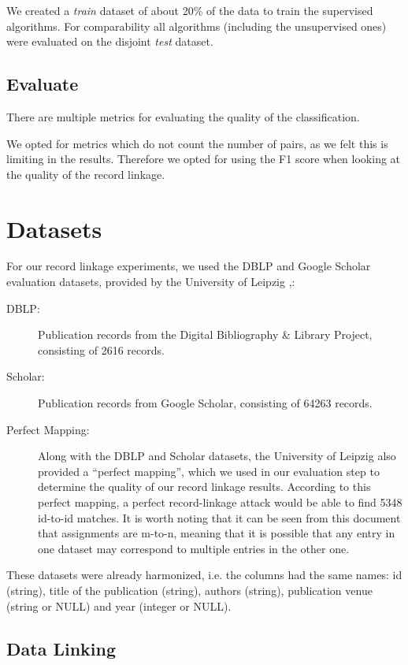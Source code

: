 \documentclass[sigconf,nonacm]{acmart}
\begin{document}
We created a \emph{train} dataset of about 20\% of the data to train
the supervised algorithms.
For comparability all algorithms (including the unsupervised ones)
were evaluated on the disjoint \emph{test} dataset.

\subsection{Evaluate}

There are multiple metrics for evaluating the quality of the classification.

We opted for metrics which do not count the number of pairs, as we felt
this is limiting in the results.
Therefore we opted for using the F1 score when looking at the quality
of the record linkage.

\section{Datasets}

For our record linkage experiments, we used the DBLP and Google Scholar evaluation datasets, provided by the University of Leipzig \cite{DataSets},\cite{kopcke2010evaluation}:

\begin{description}
\item[DBLP:] Publication records from the Digital Bibliography \& Library Project, consisting of 2616 records.
\item[Scholar:] Publication records from Google Scholar, consisting of 64263 records.
\item[Perfect Mapping:] Along with the DBLP and Scholar datasets, the University of Leipzig also provided a ``perfect mapping'', which we used in our evaluation step to determine the quality of our record linkage results. According to this perfect mapping, a perfect record-linkage attack would be able to find 5348 id-to-id matches. It is worth noting that it can be seen from this document that assignments are m-to-n, meaning that it is possible that any entry in one dataset may correspond to multiple entries in the other one.
\end{description}

These datasets were already harmonized, i.e. the columns had the same names: id (string), title of the publication (string), authors (string), publication venue (string or NULL) and year (integer or NULL).

\subsection{Data Linking}
\end{document}

